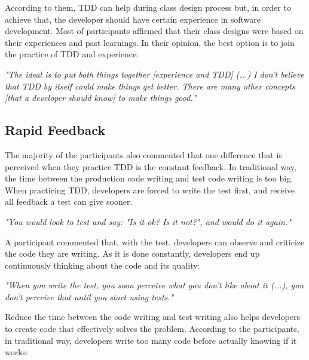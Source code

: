\documentclass[conference]{IEEEtran}
\begin{document}
According to them, TDD can help during class design process but, in order to achieve that,
the developer should have certain experience in software development. Most of participants
affirmed that their class designs were based on their experiences and past learnings.
In their opinion, the best option is to join the practice of TDD and experience:

\begin{framed}

	\textit{"The ideal is to put both things together [experience and TDD] (...) 
	I don't believe that TDD by itself could make things get better. There are many other
	concepts [that a developer should know] to make things good."}

\end{framed}

\subsection{Rapid Feedback}

The majority of the participants also commented that one difference that is
perceived when they practice TDD is the constant feedback. In traditional way,
the time between the production code writing and test code writing is too big.
When practicing TDD, developers are forced to write the test first, and receive all
feedback a test can give sooner.

\begin{framed}
	\textit{"You would look to test and say: "Is it ok? Is it not?", and would do it again."}
\end{framed}

A participant commented that, with the test, developers can observe
and criticize the code they are writing. As it is done constantly,
developers end up continuously thinking about the code and its
quality:

\begin{framed}
	\textit{"When you write the test, you soon perceive what you don't like about it (...), 
	you don't perceive that until you start using tests."}
\end{framed}

Reduce the time between the code writing and test writing also helps developers to
create code that effectively solves the problem. According to the participants, in traditional
way, developers write too many code before actually knowing if it works:
\end{document}
